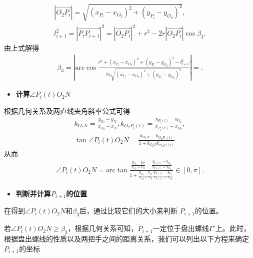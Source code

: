 \documentclass[../main.tex]{subfiles}
\begin{document}
\begin{gather}\label{1.........454}
\left| \overrightarrow{O_2P_i} \right|=\sqrt{\left( x_{P_i}-x_{O_2} \right) ^2+\left( y_{P_i}-y_{O_2} \right) ^2},
\\
l_{i+1}^{2}=\left| \overrightarrow{P_iP_{i+1}} \right|^2=\left| \overrightarrow{O_2P_i} \right|^2+r^2-2r\left| \overrightarrow{O_2P_i} \right|\cos \beta _3.
\end{gather}
由上式解得
\begin{align}\label{1.........455}
\beta _3=\left| \mathrm{arc}\cos \frac{r^2+\left( x_{P_i}-x_{O_2} \right) ^2+\left( y_{P_i}-y_{O_2} \right) ^2-l_{i+1}^{2}}{2r\sqrt{\left( x_{P_i}-x_{O_2} \right) ^2+\left( y_{P_i}-y_{O_2} \right) ^2}} \right|=.
\end{align}

\begin{itemize}
\item \textbf{计算$\angle P_{i}(t)O_2N$}
\end{itemize}

\par 根据几何关系及两直线夹角斜率公式可得
\begin{gather}\label{1.........456}
k_{O_2N}=\frac{y_{O_2}-y_N}{x_{O_2}-x_N},k_{O_2P_i\left( t \right)}=\frac{y_{P_i\left( t \right)}-y_{O_2}}{x_{P_i\left( t \right)}-x_{O_2}},
\\
\tan \angle P_i(t)O_2N=\frac{k_{O_2N}-k_{O_2P_i\left( t \right)}}{1+k_{O_2N}k_{O_2P_i\left( t \right)}}.
\end{gather}
从而
\begin{align}\label{1.........457}
\angle P_i(t)O_2N=\mathrm{arc}\tan \frac{\frac{y_{O_2}-y_N}{x_{O_2}-x_N}-\frac{y_{P_i\left( t \right)}-y_{O_2}}{x_{P_i\left( t \right)}-x_{O_2}}}{1+\frac{y_{O_2}-y_N}{x_{O_2}-x_N}\frac{y_{P_i\left( t \right)}-y_{O_2}}{x_{P_i\left( t \right)}-x_{O_2}}}\in \left[ 0,\pi \right] .
\end{align}
\begin{itemize}
\item \textbf{判断并计算$P_{i+1}$的位置}
\end{itemize}
\par 在得到$\angle P_{i}(t)O_{2}N$和$\beta_{3}$后，通过比较它们的大小来判断 $P_{i + 1} $的位置。

\par 若$\angle P_{i}(t)O_{2}N \geq \beta_{3}$，根据几何关系可知，$P_{i + 1}$一定位于盘出螺线$\Gamma'$上。此时，根据盘出螺线的性质以及两把手之间的距离关系，我们可以列出以下方程来确定$ P_{i + 1} $的坐标
\end{document}
